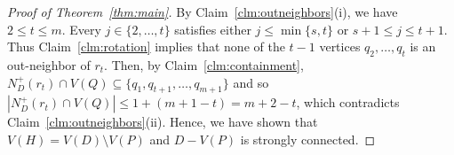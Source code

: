 \documentclass[10pt,a4paper]{amsart}
\begin{document}
\begin{proof}[Proof of Theorem~\ref{thm:main}]
By Claim~\ref{clm:outneighbors}(i), we have $2\le t\le m$.
Every $j\in\{2,\ldots,t\}$ satisfies either $j\le\min\{s,t\}$ or $s+1\le j\le t+1$.
Thus Claim~\ref{clm:rotation} implies that none of the $t-1$ vertices $q_2,\ldots,q_t$ is an out-neighbor of $r_t$.
Then, by Claim~\ref{clm:containment}, $N_D^+(r_t)\cap V(Q)\subseteq \{q_1, q_{t+1}, \ldots, q_{m+1}\}$ and so $|N_D^+(r_t)\cap V(Q)|\le 1+(m+1-t)=m+2-t$, which contradicts Claim~\ref{clm:outneighbors}(ii).
Hence, we have shown that $V(H)=V(D)\setminus V(P)$ and $D-V(P)$ is strongly connected.
\end{proof}
\end{document}
